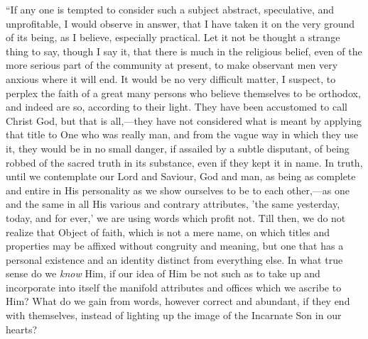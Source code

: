 ``If any one is tempted to consider such a subject abstract,
speculative, and unprofitable, I would observe in answer, that I have
taken it on the very ground of its being, as I believe, especially
practical. Let it not be thought a strange thing to say, though I say
it, that there is much in the religious belief, even of the more
serious part of the community at present, to make observant men very
anxious where it will end. It would be no very difficult matter, I
suspect, to perplex the faith of a great many persons who believe
themselves to be orthodox, and indeed are so, according to their
light. They have been accustomed to call Christ God, but that is all,—they
have not considered what is meant by applying that title to One who
was really man, and from the vague way in which they use it, they
would be in no small danger, if assailed by a subtle disputant, of
being robbed of the sacred truth in its substance, even if they kept
it in name. In truth, until we contemplate our Lord and Saviour, God
and man, as being as complete and entire in His personality as we show
ourselves to be to each other,—as one and the same in all His various and contrary attributes, 'the same yesterday, today, and for
ever,' we are using words which profit not. Till then, we do not
realize that Object of faith, which is not a mere name, on which
titles and properties may be affixed without congruity and meaning,
but one that has a personal existence and an identity distinct from
everything else. In what true sense do we \emph{know} Him, if our idea
of Him be not such as to take up and incorporate into itself the
manifold attributes and offices which we ascribe to Him? What do we
gain from words, however correct and abundant, if they end with
themselves, instead of lighting up the image of the Incarnate Son in
our hearts?

